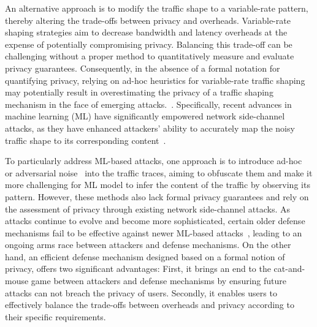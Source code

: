 An alternative approach is to modify the traffic shape to a variable-rate pattern, thereby altering the trade-offs between privacy and overheads.
Variable-rate shaping strategies aim to decrease bandwidth and latency overheads at the expense of potentially compromising privacy.
Balancing  this trade-off can be challenging without a proper method to quantitatively measure and evaluate privacy guarantees. 
Consequently, in the absence of a formal notation for quantifying privacy, relying on ad-hoc heuristics for variable-rate traffic shaping may potentially result in overestimating the privacy of a traffic shaping mechanism in the face of emerging attacks.~\cite{gong2020zero, cai2014csbuflo, lu2018dynaflow, juarez2016wtfpad, cai2014tamaraw}.
Specifically, recent advances in machine learning (ML) have significantly empowered network side-channel attacks, as they have enhanced attackers' ability to accurately map the noisy traffic shape to its corresponding content~\cite{schuster2017beautyburst, bhat2019varcnn, hayes2016kfp, sirinam2018df}.

To particularly address ML-based attacks, one approach is to introduce ad-hoc~\cite{luo2011httpos} or adversarial noise~\cite{shan2021dolos, nasr2021blind, rahman2020mockingbird} into the traffic traces, aiming to obfuscate them and make it more challenging for ML model to infer the content of the traffic by observing its pattern. 
However, these methods also lack formal privacy guarantees and rely on the assessment of privacy through existing network side-channel attacks.
As attacks continue to evolve and become more sophisticated, certain older defense mechanisms fail to be effective against newer ML-based attacks~\cite{sirinam2018df}, leading to an ongoing arms race between attackers and defense mechanisms. 
On the other hand, an efficient defense mechanism designed based on a formal notion of privacy, offers two significant advantages: First, it brings an end to the cat-and-mouse game between attackers and defense mechanisms by ensuring future attacks can not breach the privacy of users.
Secondly, it enables users to effectively balance the trade-offs between overheads and privacy according to their specific requirements.  


